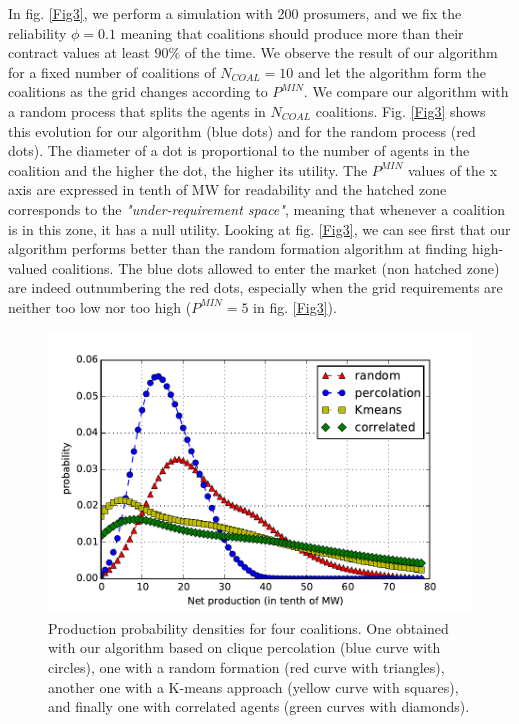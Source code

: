 \documentclass[conference]{IEEEtran}
\begin{document}
In fig. \ref{Fig3}, we perform a simulation with 200 prosumers, and we fix the reliability $ \phi = 0.1 $ meaning that coalitions should produce more than their contract values at least $ 90 \% $ of the time. We observe the result of our algorithm for a fixed number of coalitions of $N_{COAL} = 10$ and let the algorithm form the coalitions as the grid changes according to $ P^{MIN} $. We compare our algorithm with a random process that splits the agents in $ N_{COAL} $ coalitions. Fig. \ref{Fig3} shows this evolution for our algorithm (blue dots) and for the random process (red dots). The diameter of a dot is proportional to the number of agents in the coalition and the higher the dot, the higher its utility. The $ P^{MIN} $ values of the x axis are expressed in tenth of MW for readability and the hatched zone corresponds to the \textit{"under-requirement space"}, meaning that whenever a coalition is in this zone, it has a null utility. Looking at fig. \ref{Fig3}, we can see first that our algorithm performs better than the random formation algorithm at finding high-valued coalitions. The blue dots allowed to enter the market (non hatched zone) are indeed outnumbering the red dots, especially when the grid requirements are neither too low nor too high ($ P^{MIN} = 5 $ in fig. \ref{Fig3}).


\begin{figure}
  \centering
  \includegraphics[scale=0.53]{./figure11/densities.pdf}
  \caption{Production probability densities for four coalitions. One obtained with our algorithm based on clique percolation (blue curve with circles), one with a random formation (red curve with triangles), another one with a K-means approach (yellow curve with squares), and finally one with correlated agents (green curves with diamonds).}
  \label{Fig5}
\end{figure}
\end{document}
